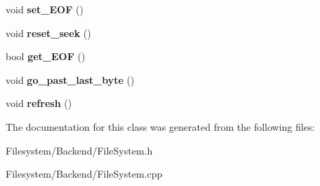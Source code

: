 \begin{DoxyCompactItemize}
void {\bfseries set\+\_\+\+E\+OF} ()
\item 
\mbox{\label{classFileOpen_a1008411faf6df97c71d0ac0a867fce11}} 
void {\bfseries reset\+\_\+seek} ()
\item 
\mbox{\label{classFileOpen_afc9043c99b42afaaa5f1712f5a45e066}} 
bool {\bfseries get\+\_\+\+E\+OF} ()
\item 
\mbox{\label{classFileOpen_a966a424badc21c4cfc9b80854a052acb}} 
void {\bfseries go\+\_\+past\+\_\+last\+\_\+byte} ()
\item 
\mbox{\label{classFileOpen_ac10189670f476050bc3fdb44d74dcb33}} 
void {\bfseries refresh} ()
\end{DoxyCompactItemize}


The documentation for this class was generated from the following files\+:\begin{DoxyCompactItemize}
\item 
Filesystem/\+Backend/File\+System.\+h\item 
Filesystem/\+Backend/File\+System.\+cpp\end{DoxyCompactItemize}
